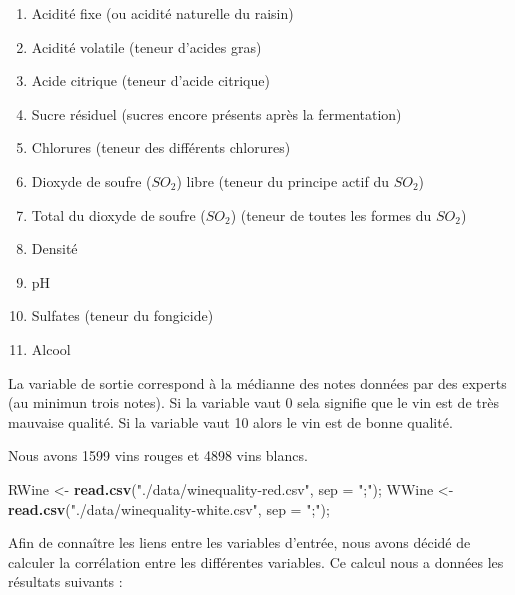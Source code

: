 \documentclass[]{article}
\newenvironment{Shaded}{\begin{snugshade}}{\end{snugshade}}
\newcommand{\DataTypeTok}[1]{\textcolor[rgb]{0.13,0.29,0.53}{#1}}
\newcommand{\KeywordTok}[1]{\textcolor[rgb]{0.13,0.29,0.53}{\textbf{#1}}}
\newcommand{\NormalTok}[1]{#1}
\newcommand{\StringTok}[1]{\textcolor[rgb]{0.31,0.60,0.02}{#1}}
\providecommand{\tightlist}{%
  \setlength{\itemsep}{0pt}\setlength{\parskip}{0pt}}
\begin{document}
\begin{enumerate}
\def\labelenumi{\arabic{enumi}.}
\tightlist
\item
  Acidité fixe (ou acidité naturelle du raisin)
\item
  Acidité volatile (teneur d'acides gras)
\item
  Acide citrique (teneur d'acide citrique)
\item
  Sucre résiduel (sucres encore présents après la fermentation)
\item
  Chlorures (teneur des différents chlorures)
\item
  Dioxyde de soufre (\(SO_2\)) libre (teneur du principe actif du
  \(SO_2\))
\item
  Total du dioxyde de soufre (\(SO_2\)) (teneur de toutes les formes du
  \(SO_2\))
\item
  Densité
\item
  pH
\item
  Sulfates (teneur du fongicide)
\item
  Alcool
\end{enumerate}

La variable de sortie correspond à la médianne des notes données par des
experts (au minimun trois notes). Si la variable vaut 0 sela signifie
que le vin est de très mauvaise qualité. Si la variable vaut 10 alors le
vin est de bonne qualité.

Nous avons 1599 vins rouges et 4898 vins blancs.

\begin{Shaded}
\begin{Highlighting}[]
\NormalTok{RWine <-}\StringTok{ }\KeywordTok{read.csv}\NormalTok{(}\StringTok{"./data/winequality-red.csv"}\NormalTok{, }\DataTypeTok{sep =} \StringTok{";"}\NormalTok{); }
\NormalTok{WWine <-}\StringTok{ }\KeywordTok{read.csv}\NormalTok{(}\StringTok{"./data/winequality-white.csv"}\NormalTok{, }\DataTypeTok{sep =} \StringTok{";"}\NormalTok{);}
\end{Highlighting}
\end{Shaded}

Afin de connaître les liens entre les variables d'entrée, nous avons
décidé de calculer la corrélation entre les différentes variables. Ce
calcul nous a données les résultats suivants :
\end{document}
